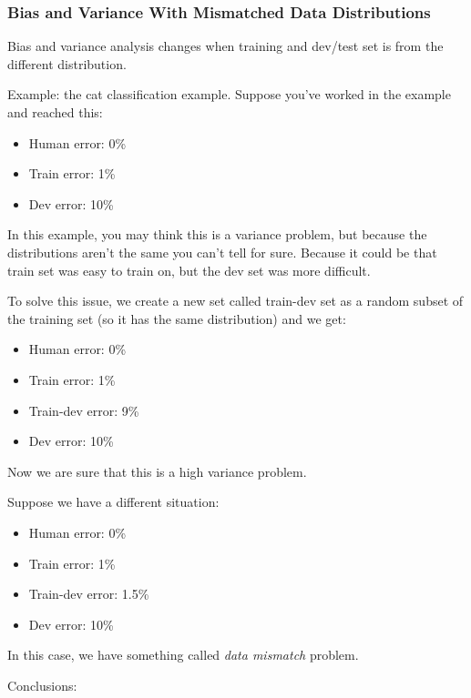 \subsubsection{Bias and Variance With Mismatched Data Distributions}
Bias and variance analysis changes when training and dev/test set is from the different distribution.

Example: the cat classification example. Suppose you've worked in the example and reached this:

\begin{itemize}
    \item Human error: 0\%
    \item Train error: 1\%
    \item Dev error: 10\%
\end{itemize}

In this example, you may think this is a variance problem, but because the distributions aren't the same you can't tell for sure. Because it could be that train set was easy to train on, but the dev set was more difficult.

To solve this issue, we create a new set called train-dev set as a random subset of the training set (so it has the same distribution) and we get:

\begin{itemize}
    \item Human error: 0\%
    \item Train error: 1\%
    \item Train-dev error: 9\%
    \item Dev error: 10\%
\end{itemize}

Now we are sure that this is a high variance problem.

Suppose we have a different situation:

\begin{itemize}
    \item Human error: 0\%
    \item Train error: 1\%
    \item Train-dev error: 1.5\%
    \item Dev error: 10\%
\end{itemize}

In this case, we have something called \textit{data mismatch} problem.

Conclusions:

